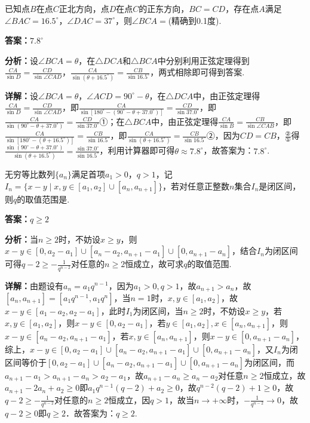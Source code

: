 \begin{question}[points=5]
已知点$B$在点$C$正北方向，点$D$在点$C$的正东方向，$BC=CD$，存在点$A$满足$\angle BAC=16.5^\circ$，$\angle DAC=37^\circ$，则$\angle BCA=$(精确到0.1度).
\fillin[{$7.8^\circ$}]
\begin{solution}
\textbf{答案：}$7.8^\circ$

\textbf{分析：}设$\angle BCA=\theta$，在$\triangle DCA$和$\triangle BCA$中分别利用正弦定理得到$\frac{CA}{\sin D}=\frac{CD}{\sin\angle CAD}$，$\frac{CA}{\sin(\theta+16.5^\circ)}=\frac{CB}{\sin16.5^\circ}$，两式相除即可得到答案.

\textbf{详解：}设$\angle BCA=\theta$，$\angle ACD=90^\circ-\theta$，在$\triangle DCA$中，由正弦定理得$\frac{CA}{\sin D}=\frac{CD}{\sin\angle CAD}$，即$\frac{CA}{\sin[180^\circ-(90^\circ-\theta+37.0^\circ)]}=\frac{CD}{\sin37.0^\circ}$，即$\frac{CA}{\sin(90^\circ-\theta+37.0^\circ)}=\frac{CD}{\sin37.0^\circ}$①；在$\triangle BCA$中，由正弦定理得$\frac{CA}{\sin B}=\frac{CB}{\sin\angle CAB}$，即$\frac{CA}{\sin[180^\circ-(\theta+16.5^\circ)]}=\frac{CB}{\sin16.5^\circ}$，即$\frac{CA}{\sin(\theta+16.5^\circ)}=\frac{CB}{\sin16.5^\circ}$②，因为$CD=CB$，$\frac{②}{①}$得$\frac{\sin(90^\circ-\theta+37.0^\circ)}{\sin(\theta+16.5^\circ)}=\frac{\sin37.0^\circ}{\sin16.5^\circ}$，利用计算器即可得$\theta\approx7.8^\circ$，故答案为：$7.8^\circ$.
\end{solution}
\end{question}

\begin{question}[points=5]
无穷等比数列$\{a_n\}$满足首项$a_1>0$，$q>1$，记$I_n=\{x-y\mid x,y\in[a_1,a_2]\cup[a_n,a_{n+1}]\}$，若对任意正整数$n$集合$I_n$是闭区间，则$q$的取值范围是.
\fillin[{$q\ge2$}]
\begin{solution}
\textbf{答案：}$q\ge2$

\textbf{分析：}当$n\ge2$时，不妨设$x\ge y$，则$x-y\in[0,a_2-a_1]\cup[a_n-a_2,a_{n+1}-a_1]\cup[0,a_{n+1}-a_n]$，结合$I_n$为闭区间可得$q-2\ge-\frac{1}{q^{n-2}}$对任意的$n\ge2$恒成立，故可求$q$的取值范围.

\textbf{详解：}由题设有$a_n=a_1q^{n-1}$，因为$a_1>0,q>1$，故$a_{n+1}>a_n$，故$[a_n,a_{n+1}]=[a_1q^{n-1},a_1q^n]$，当$n=1$时，$x,y\in[a_1,a_2]$，故$x-y\in[a_1-a_2,a_2-a_1]$，此时$I_1$为闭区间，当$n\ge2$时，不妨设$x\ge y$，若$x,y\in[a_1,a_2]$，则$x-y\in[0,a_2-a_1]$，若$y\in[a_1,a_2],x\in[a_n,a_{n+1}]$，则$x-y\in[a_n-a_2,a_{n+1}-a_1]$，若$x,y\in[a_n,a_{n+1}]$，则$x-y\in[0,a_{n+1}-a_n]$，综上，$x-y\in[0,a_2-a_1]\cup[a_n-a_2,a_{n+1}-a_1]\cup[0,a_{n+1}-a_n]$，又$I_n$为闭区间等价于$[0,a_2-a_1]\cup[a_n-a_2,a_{n+1}-a_1]\cup[0,a_{n+1}-a_n]$为闭区间，而$a_{n+1}-a_1>a_{n+1}-a_n>a_2-a_1$，故$a_{n+1}-a_n\ge a_n-a_2$对任意$n\ge2$恒成立，故$a_{n+1}-2a_n+a_2\ge0$即$a_1q^{n-1}(q-2)+a_2\ge0$，故$q^{n-2}(q-2)+1\ge0$，故$q-2\ge-\frac{1}{q^{n-2}}$对任意的$n\ge2$恒成立，因$q>1$，故当$n\to+\infty$时，$-\frac{1}{q^{n-2}}\to0$，故$q-2\ge0$即$q\ge2$．故答案为：$q\ge2$.
\end{solution}
\end{question}

